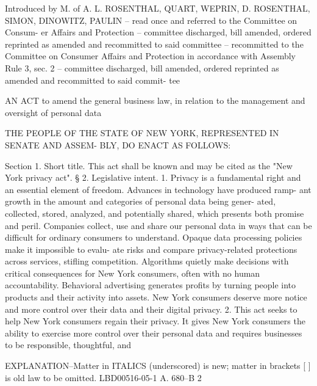Introduced by M. of A. L. ROSENTHAL, QUART, WEPRIN, D. ROSENTHAL, SIMON,
   DINOWITZ, PAULIN -- read once and referred to the Committee on Consum-
   er  Affairs  and  Protection  --  committee  discharged, bill amended,
   ordered reprinted as amended and  recommitted  to  said  committee  --
   recommitted  to  the  Committee  on Consumer Affairs and Protection in
   accordance with Assembly Rule 3, sec. 2 -- committee discharged,  bill
   amended,  ordered reprinted as amended and recommitted to said commit-
   tee
 
 AN ACT to amend the general business law, in relation to the  management
   and oversight of personal data
 
   THE  PEOPLE OF THE STATE OF NEW YORK, REPRESENTED IN SENATE AND ASSEM-
 BLY, DO ENACT AS FOLLOWS:
 
   Section 1. Short title. This act shall be known and may  be  cited  as
 the "New York privacy act".
   §  2.  Legislative  intent.  1.  Privacy is a fundamental right and an
 essential element of freedom. Advances in technology have produced ramp-
 ant growth in the amount and categories of personal  data  being  gener-
 ated,   collected,  stored,  analyzed,  and  potentially  shared,  which
 presents both promise and peril. Companies collect, use  and  share  our
 personal  data  in  ways that can be difficult for ordinary consumers to
 understand. Opaque data processing policies make it impossible to evalu-
 ate risks  and  compare  privacy-related  protections  across  services,
 stifling  competition.  Algorithms  quietly make decisions with critical
 consequences for New York consumers, often with no human accountability.
 Behavioral advertising generates profits by turning people into products
 and their activity into assets. New York consumers deserve  more  notice
 and more control over their data and their digital privacy.
   2. This act seeks to help New York consumers regain their privacy.  It
 gives New York consumers the ability to exercise more control over their
 personal data and requires businesses to be responsible, thoughtful, and

  EXPLANATION--Matter in ITALICS (underscored) is new; matter in brackets
                       [ ] is old law to be omitted.
                                                            LBD00516-05-1
 A. 680--B                           2
 
